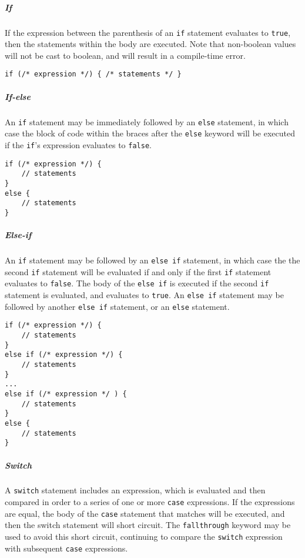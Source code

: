 \documentclass[]{article}
\begin{document}
\subparagraph{If}\label{if}

If the expression between the parenthesis of an \texttt{if} statement
evaluates to \texttt{true}, then the statements within the body are
executed. Note that non-boolean values will not be cast to boolean, and
will result in a compile-time error.

\begin{verbatim}
if (/* expression */) { /* statements */ }
\end{verbatim}

\subparagraph{If-else}\label{if-else}

An \texttt{if} statement may be immediately followed by an \texttt{else}
statement, in which case the block of code within the braces after the
\texttt{else} keyword will be executed if the \texttt{if}'s expression
evaluates to \texttt{false}.

\begin{verbatim}
if (/* expression */) {
    // statements
}
else {
    // statements
}
\end{verbatim}

\subparagraph{Else-if}\label{else-if}

An \texttt{if} statement may be followed by an \texttt{else if}
statement, in which case the the second \texttt{if} statement will be
evaluated if and only if the first \texttt{if} statement evaluates to
\texttt{false}. The body of the \texttt{else if} is executed if the
second \texttt{if} statement is evaluated, and evaluates to
\texttt{true}. An \texttt{else if} statement may be followed by another
\texttt{else if} statement, or an \texttt{else} statement.

\begin{verbatim}
if (/* expression */) {
    // statements
}
else if (/* expression */) {
    // statements
}
...
else if (/* expression */ ) {
    // statements
}
else {
    // statements
}
\end{verbatim}

\subparagraph{Switch}\label{switch}

A \texttt{switch} statement includes an expression, which is evaluated
and then compared in order to a series of one or more \texttt{case}
expressions. If the expressions are equal, the body of the \texttt{case}
statement that matches will be executed, and then the switch statement
will short circuit. The \texttt{fallthrough} keyword may be used to
avoid this short circuit, continuing to compare the \texttt{switch}
expression with subsequent \texttt{case} expressions.
\end{document}
